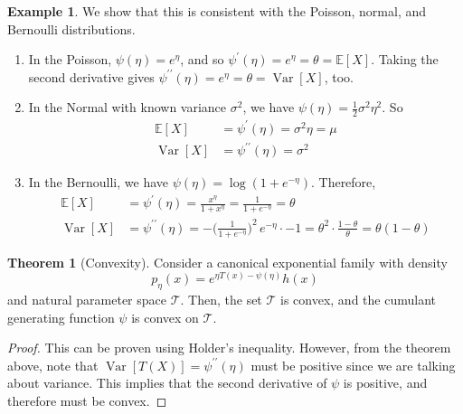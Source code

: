 \documentclass{article}
\DeclareMathOperator{\Var}{Var}
\theoremstyle{definition}
\newtheorem{theorem}{Theorem}[section]
\newtheorem{example}{Example}[section]
\theoremstyle{remark}
\theoremstyle{definition}
\begin{document}
\begin{example}
We show that this is consistent with the Poisson, normal, and Bernoulli distributions. 
\begin{enumerate}
    \item In the Poisson, $\psi(\eta) = e^{\eta}$, and so $\psi^\prime(\eta) = e^\eta = \theta = \mathbb{E}[X]$. Taking the second derivative gives $\psi^{\prime\prime}(\eta) = e^\eta = \theta = \Var[X]$, too. \
    
    \item In the Normal with known variance $\sigma^2$, we have $\psi(\eta) = \frac{1}{2} \sigma^2 \eta^2$. So 
    \begin{align*}
        \mathbb{E}[X] & = \psi^\prime (\eta) = \sigma^2 \eta = \mu \\
        \Var[X] & = \psi^{\prime\prime} (\eta) = \sigma^2
    \end{align*}

    \item In the Bernoulli, we have $\psi(\eta) = \log(1 + e^{-\eta})$. Therefore, 
    \begin{align*}
        \mathbb{E}[X] & = \psi^\prime (\eta) = \frac{x^\eta}{1 + x^{\eta}} = \frac{1}{1 + e^{-\eta}} = \theta \\
        \Var[X] & = \psi^{\prime\prime} (\eta) = -\bigg(\frac{1}{1 + e^{-\eta}}\bigg)^2 \, e^{-\eta} \cdot -1 = \theta^2 \cdot \frac{1 - \theta}{\theta} = \theta (1 - \theta) 
    \end{align*}
\end{enumerate}
\end{example}

\begin{theorem}[Convexity]
Consider a canonical exponential family with density 
\[p_\eta (x) = e^{\eta T(x) - \psi(\eta)} h(x)\]
and natural parameter space $\mathcal{T}$. Then, the set $\mathcal{T}$ is convex, and the cumulant generating function $\psi$ is convex on $\mathcal{T}$. 
\end{theorem}
\begin{proof}
This can be proven using Holder's inequality. However, from the theorem above, note that $\Var[T(X)] = \psi^{\prime\prime}(\eta)$ must be positive since we are talking about variance. This implies that the second derivative of $\psi$ is positive, and therefore must be convex. 
\end{proof}
\end{document}
